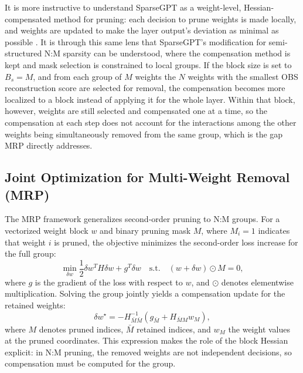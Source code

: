 It is more instructive to understand SparseGPT as a weight-level, Hessian-compensated method for pruning: each decision to prune weights is made locally, and weights are updated to make the layer output's deviation as minimal as possible \cite{frantar2023sparsegpt}. It is through this same lens that SparseGPT's modification for semi-structured N:M sparsity can be understood, where the compensation method is kept and mask selection is constrained to local groups. If the block size is set to $B_s = M$, and from each group of $M$ weights the $N$ weights with the smallest OBS reconstruction score are selected for removal, the compensation becomes more localized to a block instead of applying it for the whole layer. Within that block, however, weights are still selected and compensated one at a time, so the compensation at each step does not account for the interactions among the other weights being simultaneously removed from the same group, which is the gap MRP directly addresses.

\methodsep

\subsection{Joint Optimization for Multi-Weight Removal (MRP)}

The MRP framework \cite{zhao2024pruning} generalizes second-order pruning to N:M groups. For a vectorized weight block $w$ and binary pruning mask $M$, where $M_i=1$ indicates that weight $i$ is pruned, the objective minimizes the second-order loss increase for the full group:
\begin{equation}\label{eq:ptp}
	\min_{\delta w} \frac{1}{2}\delta w^T H \delta w + g^T \delta w
	\quad\text{s.t.}\quad
	(w+\delta w)\odot M = 0,
\end{equation}
where $g$ is the gradient of the loss with respect to $w$, and $\odot$ denotes elementwise multiplication. Solving the group jointly yields a compensation update for the retained weights:
\begin{equation}
	\delta w^\star = -H_{\bar{M}\bar{M}}^{-1}(g_{\bar{M}} + H_{\bar{M}M}w_M),
\end{equation}
where $M$ denotes pruned indices, $\bar{M}$ retained indices, and $w_M$ the weight values at the pruned coordinates. This expression makes the role of the block Hessian explicit: in N:M pruning, the removed weights are not independent decisions, so compensation must be computed for the group.

